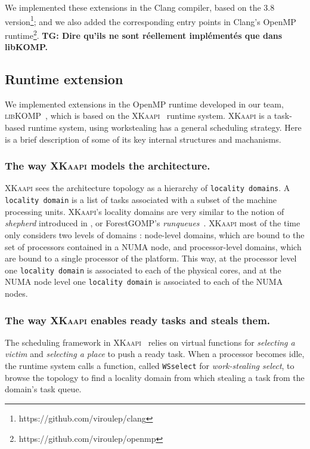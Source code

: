 \documentclass{Styles/llncs}
\newcommand{\kaapi}{\textsc{\mbox{XKaapi}}\xspace}
\newcommand{\libXKOMP}{\textsc{libKOMP}\xspace}
\newcommand{\TG}[1]{{\color{red}\bfseries TG: #1}}
\begin{document}
We implemented these extensions in the Clang compiler, based on the 3.8 version\footnote{https://github.com/viroulep/clang}; and we also added the corresponding entry points in Clang's OpenMP runtime\footnote{https://github.com/viroulep/openmp}.
\TG{Dire qu'ils ne sont réellement implémentés que dans libKOMP.}


\subsection{Runtime extension}

We implemented extensions in the OpenMP runtime developed in our team, \libXKOMP~\cite{Durand2013,libkomp},
which is based on the \kaapi~\cite{Bleuse2014,parco2015} runtime system.
\kaapi is a task-based runtime system, using workstealing has a general scheduling strategy.
Here is a brief description of some of its key internal structures and machanisms.

\subsubsection{The way \kaapi models the architecture.}
\kaapi sees the architecture topology as a hierarchy of \verb/locality domains/.
A \verb/locality domain/ is a list of tasks associated with a subset of the machine processing units.
\kaapi's locality domains are very similar to the notion of \emph{shepherd} introduced in \cite{DBLP:journals/ijhpca/OlivierPWSP12}, or ForestGOMP's \emph{runqueues}~\cite{BroFurGogWacNam10IJPP}.
\kaapi most of the time only considers two levels of domains : node-level domains,
which are bound to the set of processors contained in a NUMA node, and processor-level domains, which are bound to a single processor of the platform.
This way, at the processor level one \verb/locality domain/ is associated to each of the physical cores, and
at the NUMA node level one \verb/locality domain/ is associated to each of the NUMA nodes.


\subsubsection{The way \kaapi enables ready tasks and steals them.}

The scheduling framework in \kaapi~\cite{Bleuse2014,parco2015} relies on virtual functions
for \textit{selecting a victim} and \textit{selecting a place} to push a ready task.
When a processor becomes idle, the runtime system calls a function, called  \verb/WSselect/ for \emph{work-stealing select}, to browse the topology to find a locality domain from which stealing a task from the domain's task queue.
\end{document}
